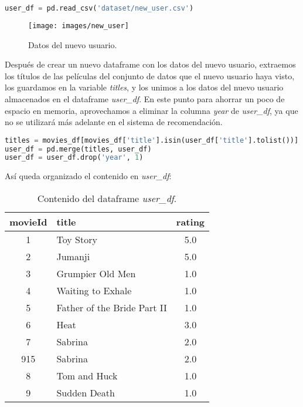\documentclass{uimppracticas}
\begin{document}
\begin{lstlisting}[language=python, basicstyle=\small]
user_df = pd.read_csv('dataset/new_user.csv')
\end{lstlisting}

\begin{figure}[H]
	\centering
	\texttt{[image: images/new\_user]}
	\caption{Datos del nuevo usuario.}
	\label{new_user}
\end{figure}

Después de crear un nuevo dataframe con los datos del nuevo usuario, extraemos los títulos de las películas del conjunto de datos que el nuevo usuario haya visto, los guardamos en la variable \textit{titles}, y los unimos a los datos del nuevo usuario almacenados en el dataframe \textit{user\_df}. En este punto para ahorrar un poco de espacio en memoria, aprovechamos a eliminar la columna \textit{year} de \textit{user\_df}, ya que no se utilizará más adelante en el sistema de recomendación.

\begin{lstlisting}[language=python, basicstyle=\small]
titles = movies_df[movies_df['title'].isin(user_df['title'].tolist())]
user_df = pd.merge(titles, user_df)
user_df = user_df.drop('year', 1)
\end{lstlisting}

Así queda organizado el contenido en \textit{user\_df}:

\begin{table}[H]
	\centering
	\begin{tabular}{clc}
		\toprule
		movieId &                  title &  rating \\
		\midrule
		1 &                    Toy Story &     5.0 \\
		2 &                      Jumanji &     5.0 \\
		3 &             Grumpier Old Men &     1.0 \\
		4 &            Waiting to Exhale &     1.0 \\
		5 &  Father of the Bride Part II &     1.0 \\
		6 &                         Heat &     3.0 \\
		7 &                      Sabrina &     2.0 \\
		915 &                      Sabrina &     2.0 \\
		8 &                 Tom and Huck &     1.0 \\
		9 &                 Sudden Death &     1.0 \\
		\bottomrule
	\end{tabular}
	\caption{Contenido del dataframe \textit{user\_df}.}
	\label{user_df}
\end{table}
\end{document}
